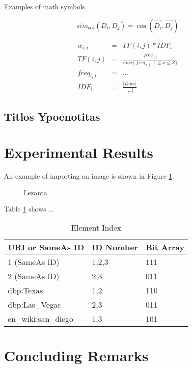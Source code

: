 \documentclass{article}
\begin{document}
Examples of math symbols


\[
sim_{\cos}(D_i,D_j) = \cos (\vec{D_i}, \vec{D_j})
\]


\begin{eqnarray}
   w_{i,j}      &=& TF(i,j) * IDF_i \\
   TF(i,j)      &=& \frac { freq_{i,j} } { max \{~freq_{x,j} ~|~ 1\leq x \leq Z \} } \\
   freq_{i,j}   &=&  ... \\
   IDF_i     &=& \frac {|Docs|} { .... | }
\end{eqnarray}




\subsection{Titlos Ypoenotitas}




\section{Experimental Results}
\label{sec:ER}


An example of importing an image is shown in Figure \ref{fig:ourVsRocchio}.


\begin{figure}[htbp]
\centering
{} %
\caption{Lezanta}
\label{fig:ourVsRocchio}
\end{figure}

Table \ref{tbl:bit} shows ...

\begin{table}[htbp]
\centering
\caption{Element Index}
\label{tbl:bit}
\begin{tabular}{|l|l|l|}\hline
\textbf{URI or SameAs ID}&\textbf{ID Number}&\textbf{Bit Array}   \\\hline \hline
1 (SameAs ID) &1,2,3 & 111 \\ \hline
2 (SameAs ID)  & 2,3 & 011 \\ \hline
dbp:Texas  & 1,2 & 110\\\hline
dbp:Las\_Vegas  & 2,3 & 011\\\hline
en\_wiki:san\_diego &1,3 &101 \\ \hline
\end{tabular}
\vspace*{-5mm}
\end{table}


\section{Concluding Remarks}
\label{sec:Conclusion}





\end{document}
